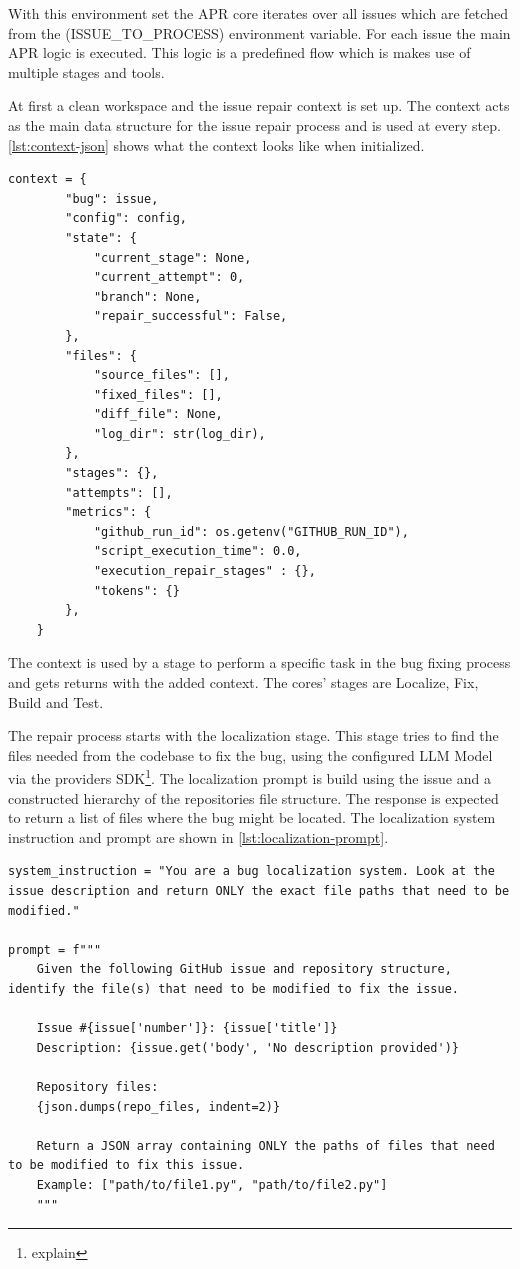 With this environment set the APR core iterates over all issues which are fetched from the (ISSUE\_TO\_PROCESS) environment variable. For each issue the main APR logic is executed. This logic is a predefined flow which is makes use of multiple stages and tools.

At first a clean workspace and the issue repair context is set up. The context acts as the main data structure for the issue repair process and is used at every step. \ref{lst:context-json} shows what the context looks like when initialized.

\begin{lstlisting}[caption={Context JSON}, label={lst:context-json}]  
    context = {
        "bug": issue,
        "config": config,
        "state": {
            "current_stage": None,
            "current_attempt": 0,
            "branch": None,
            "repair_successful": False,
        },
        "files": {
            "source_files": [],
            "fixed_files": [],
            "diff_file": None,
            "log_dir": str(log_dir),
        },
        "stages": {},
        "attempts": [],
        "metrics": {
            "github_run_id": os.getenv("GITHUB_RUN_ID"),
            "script_execution_time": 0.0,
            "execution_repair_stages" : {},
            "tokens": {}
        },
    }
\end{lstlisting}

The context is used by a stage to perform a specific task in the bug fixing process and gets returns with the added context. The cores' stages are Localize, Fix, Build and Test.

The repair process starts with the localization stage. This stage tries to find the files needed from the codebase to fix the bug, using the configured LLM Model via the providers SDK\footnote{explain}. The localization prompt is build using the issue and a constructed hierarchy of the repositories file structure. The response is expected to return a list of files where the bug might be located. The localization system instruction and prompt are shown in \ref{lst:localization-prompt}.

\begin{lstlisting}[caption={Localization Prompt}, label={lst:localization-prompt}]
system_instruction = "You are a bug localization system. Look at the issue description and return ONLY the exact file paths that need to be modified."

prompt = f"""
    Given the following GitHub issue and repository structure, identify the file(s) that need to be modified to fix the issue.

    Issue #{issue['number']}: {issue['title']}
    Description: {issue.get('body', 'No description provided')}

    Repository files:
    {json.dumps(repo_files, indent=2)}

    Return a JSON array containing ONLY the paths of files that need to be modified to fix this issue.
    Example: ["path/to/file1.py", "path/to/file2.py"]
    """
\end{lstlisting}

